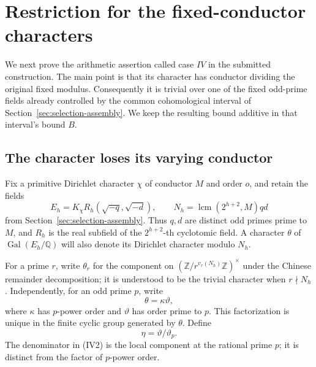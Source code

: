 \section{Restriction for the fixed-conductor characters}
\label{iv-section}

We next prove the arithmetic assertion called case $IV$ in the
submitted construction.\cite{alpo-uniform-source} The main point is
that its character has conductor dividing the original fixed modulus.
Consequently it is trivial over one of the fixed odd-prime fields
already controlled by the common cohomological interval of
Section~\ref{sec:selection-assembly}. We keep the resulting bound
additive in that interval's bound $B$.

\subsection{The character loses its varying conductor}

Fix a primitive Dirichlet character $\chi$ of conductor $M$ and
order $o$, and retain the fields
\[
 E_h=K_\chi R_h(\sqrt{-q},\sqrt{-d}),\qquad
 N_h=\operatorname{lcm}(2^{h+2},M)qd
                                                               \tag{IV1}
\]
from Section~\ref{sec:selection-assembly}. Thus $q,d$ are distinct
odd primes prime to $M$, and $R_h$ is the real subfield of the
$2^{h+2}$-th cyclotomic field. A character $\theta$ of
$\operatorname{Gal}(E_h/\mathbb Q)$ will also denote its
Dirichlet character modulo $N_h$.

For a prime $r$, write $\theta_r$ for the component on
$(\mathbb Z/r^{v_r(N_h)}\mathbb Z)^\times$ under the Chinese
remainder decomposition; it is understood to be the trivial
character when $r\nmid N_h$. Independently, for an odd prime
$p$, write
\[
                    \theta=\kappa\vartheta,
\]
where $\kappa$ has $p$-power order and $\vartheta$ has
order prime to $p$. This factorization is unique in the finite
cyclic group generated by $\theta$. Define
\[
                              \eta=\vartheta/\vartheta_p.
                                                               \tag{IV2}
\]
The denominator in (IV2) is the local component at the rational
prime $p$; it is distinct from the factor of $p$-power order.

